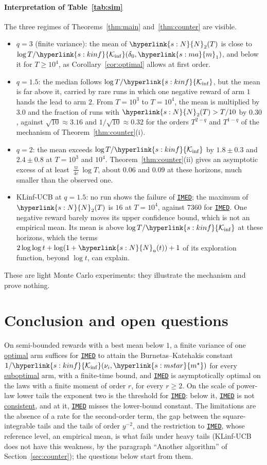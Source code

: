 \documentclass[11pt]{article}
\newcommand{\sy}[2]{{\hyperlink{#1}{#2}}}
\newcommand{\term}[2]{\hyperlink{#1}{#2}}
\newcommand{\imed}{\hyperref[alg:imed]{\texttt{IMED}}}
\newcommand{\marm}{\sy{s:ma}{m}}
\newcommand{\ms}{\sy{s:mstar}{m^{\star}}}
\newcommand{\Kinf}{\sy{s:kinf}{\mathcal{K}_{\inf}}}
\newcommand{\Np}{\sy{s:N}{N}}
\begin{document}
\paragraph{Interpretation of Table~\ref{tab:sim}} The three regimes of Theorems~\ref{thm:main}
and~\ref{thm:counter} are visible.
\begin{itemize}[leftmargin=*]
\item $q=3$ (finite variance): the mean of $\Np_2(T)$ is close to $\log T/\Kinf(\delta_0,\marm_1)$, and
  below it for $T\ge10^4$, as Corollary~\ref{cor:optimal} allows at first order.
\item $q=1.5$: the median follows $\log T/\Kinf$, but the mean is far above it, carried by rare runs
  in which one negative reward of arm $1$ hands the lead to arm $2$. From $T=10^3$ to $T=10^4$, the
  mean is multiplied by $3.0$ and the fraction of runs with $\Np_2(T)>T/10$ by $0.30$, against
  $\sqrt{10}\approx3.16$ and $1/\sqrt{10}\approx0.32$ for the orders $T^{2-q}$ and $T^{1-q}$ of the
  mechanism of Theorem~\ref{thm:counter}(i).
\item $q=2$: the mean exceeds $\log T/\Kinf$ by $1.8\pm0.3$ and $2.4\pm0.8$ at $T=10^3$ and $10^4$.
  Theorem~\ref{thm:counter}(ii) gives an asymptotic excess of at least $\frac{\varpi}{4e}\log T$, about
  $0.06$ and $0.09$ at these horizons, much smaller than the observed one.
\item KLinf-UCB at $q=1.5$: no run shows the failure of \imed{}; the maximum of $\Np_2(T)$ is $16$ at
  $T=10^4$, against $7360$ for \imed{}. One negative reward barely moves its upper confidence bound,
  which is not an empirical mean. Its mean is above $\log T/\Kinf$ at these horizons, which the
  terms $2\log\log t+\log(1+\Np_a(t))+1$ of its exploration function, beyond $\log t$, can explain.
\end{itemize}
These are light Monte Carlo experiments: they illustrate the mechanism and prove nothing.

\section{Conclusion and open questions}\label{sec:open}

On semi-bounded rewards with a best mean below $1$, a finite variance of one \term{w:optimal}{optimal} arm suffices for
\imed{} to attain the Burnetas--Katehakis constant $1/\Kinf(\nu_i,\ms)$ for every \term{w:subopt}{suboptimal} arm,
with a finite-time bound, and \imed{} is asymptotically optimal on the laws with a finite moment
of order $r$, for every $r\ge2$. On the scale of power-law lower tails the exponent two is the
threshold for \imed{}: below it, \imed{} is not \term{w:consistent}{consistent}, and at it, \imed{} misses the
lower-bound constant. The limitations are the absence of a rate for the second-order term, the gap
between the square-integrable tails and the tails of order $y^{-2}$, and the restriction to
\imed{}, whose reference level, an empirical mean, is what fails under heavy tails (KLinf-UCB does
not have this weakness, by the paragraph ``Another algorithm'' of Section~\ref{sec:counter}); the
questions below start from them.
\end{document}
